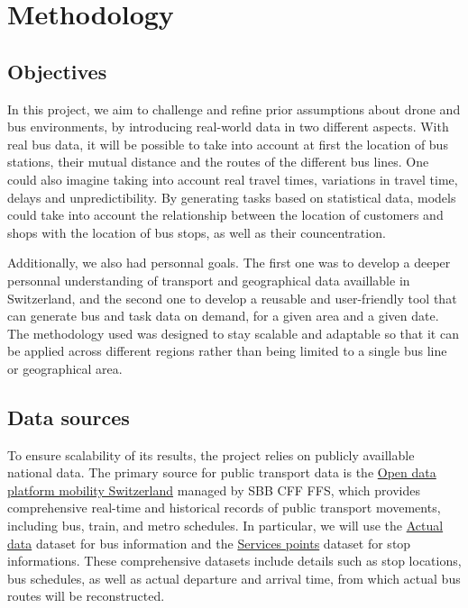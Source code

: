 \section{Methodology}
\label{sec:methodology}

\subsection{Objectives}

In this project, we aim to challenge and refine prior assumptions about drone and bus environments, by introducing real-world data in two different aspects. With real bus data, it will be possible to take into account at first the location of bus stations, their mutual distance and the routes of the different bus lines. One could also imagine taking into account real travel times, variations in travel time, delays and unpredictibility. By generating tasks based on statistical data, models could take into account the relationship between the location of customers and shops with the location of bus stops, as well as their councentration.

Additionally, we also had personnal goals. The first one was to develop a deeper personnal understanding of transport and geographical data availlable in Switzerland, and the second one to develop a reusable and user-friendly tool that can generate bus and task data on demand, for a given area and a given date. The methodology used was designed to stay scalable and adaptable so that it can be applied across different regions rather than being limited to a single bus line or geographical area.

\subsection{Data sources}

To ensure scalability of its results, the project relies on publicly availlable national data. The primary source for public transport data is the \href{opentransportdata.swiss}{Open data platform mobility Switzerland} managed by SBB CFF FFS, which provides comprehensive real-time and historical records of public transport movements, including bus, train, and metro schedules. In particular, we will use the \href{https://data.opentransportdata.swiss/en/dataset/istdaten}{Actual data} dataset for bus information and the \href{https://data.opentransportdata.swiss/en/dataset/service-points-full}{Services points} dataset for stop informations. These comprehensive datasets include details such as stop locations, bus schedules, as well as actual departure and arrival time, from which actual bus routes will be reconstructed.

